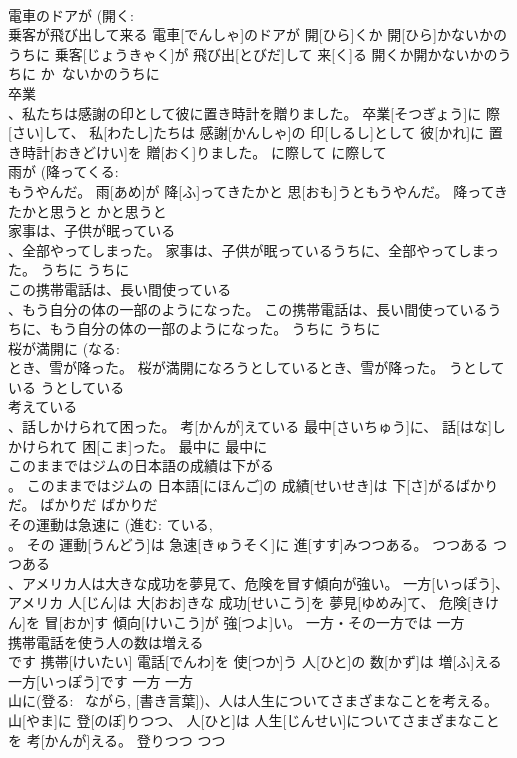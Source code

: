 \documentclass[8pt]{extreport}
\begin{document}
\begin{CJK}{UTF8}{min}
\\	電車のドアが (開く: 
\\	乗客が飛び出して来る	電車[でんしゃ]のドアが 開[ひら]くか 開[ひら]かないかのうちに 乗客[じょうきゃく]が 飛び出[とびだ]して 来[く]る	開くか開かないかのうちに	か~ないかのうちに	
\\	卒業 
\\	、私たちは感謝の印として彼に置き時計を贈りました。	卒業[そつぎょう]に 際[さい]して、 私[わたし]たちは 感謝[かんしゃ]の 印[しるし]として 彼[かれ]に 置き時計[おきどけい]を 贈[おく]りました。	に際して	に際して	
\\	雨が (降ってくる: 
\\	もうやんだ。	雨[あめ]が 降[ふ]ってきたかと 思[おも]うともうやんだ。	降ってきたかと思うと	かと思うと~	
\\	家事は、子供が眠っている 
\\	、全部やってしまった。	家事は、子供が眠っているうちに、全部やってしまった。	うちに	うちに	
\\	この携帯電話は、長い間使っている 
\\	、もう自分の体の一部のようになった。	この携帯電話は、長い間使っているうちに、もう自分の体の一部のようになった。	うちに	うちに	
\\	桜が満開に (なる:
\\	とき、雪が降った。	桜が満開になろうとしているとき、雪が降った。	うとしている	うとしている	
\\	考えている 
\\	、話しかけられて困った。	考[かんが]えている 最中[さいちゅう]に、 話[はな]しかけられて 困[こま]った。	最中に	最中に	
\\	このままではジムの日本語の成績は下がる 
\\	。	このままではジムの 日本語[にほんご]の 成績[せいせき]は 下[さ]がるばかりだ。	ばかりだ	ばかりだ	
\\	その運動は急速に (進む: ている, 
\\	。	その 運動[うんどう]は 急速[きゅうそく]に 進[すす]みつつある。	つつある	つつある	
\\	、アメリカ人は大きな成功を夢見て、危険を冒す傾向が強い。	一方[いっぽう]、アメリカ 人[じん]は 大[おお]きな 成功[せいこう]を 夢見[ゆめみ]て、 危険[きけん]を 冒[おか]す 傾向[けいこう]が 強[つよ]い。	一方・その一方では	一方	
\\	携帯電話を使う人の数は増える 
\\	です	携帯[けいたい] 電話[でんわ]を 使[つか]う 人[ひと]の 数[かず]は 増[ふ]える 一方[いっぽう]です	一方	一方	
\\	山に(登る: ~ながら, [書き言葉])、人は人生についてさまざまなことを考える。	山[やま]に 登[のぼ]りつつ、 人[ひと]は 人生[じんせい]についてさまざまなことを 考[かんが]える。	登りつつ	つつ	

\end{CJK}
\end{document}
